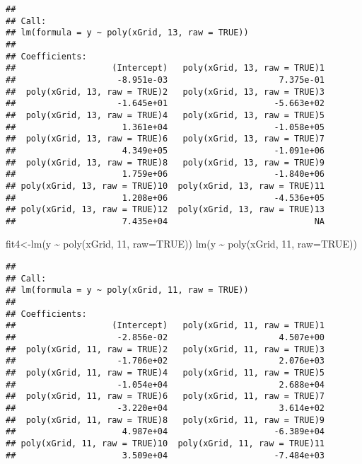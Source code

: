 \documentclass[
]{article}
\newenvironment{Shaded}{\begin{snugshade}}{\end{snugshade}}
\newcommand{\AttributeTok}[1]{\textcolor[rgb]{0.77,0.63,0.00}{#1}}
\newcommand{\ConstantTok}[1]{\textcolor[rgb]{0.00,0.00,0.00}{#1}}
\newcommand{\DecValTok}[1]{\textcolor[rgb]{0.00,0.00,0.81}{#1}}
\newcommand{\FunctionTok}[1]{\textcolor[rgb]{0.00,0.00,0.00}{#1}}
\newcommand{\NormalTok}[1]{#1}
\newcommand{\OtherTok}[1]{\textcolor[rgb]{0.56,0.35,0.01}{#1}}
\newcommand{\SpecialCharTok}[1]{\textcolor[rgb]{0.00,0.00,0.00}{#1}}
\begin{document}
\begin{verbatim}
## 
## Call:
## lm(formula = y ~ poly(xGrid, 13, raw = TRUE))
## 
## Coefficients:
##                   (Intercept)   poly(xGrid, 13, raw = TRUE)1  
##                    -8.951e-03                      7.375e-01  
##  poly(xGrid, 13, raw = TRUE)2   poly(xGrid, 13, raw = TRUE)3  
##                    -1.645e+01                     -5.663e+02  
##  poly(xGrid, 13, raw = TRUE)4   poly(xGrid, 13, raw = TRUE)5  
##                     1.361e+04                     -1.058e+05  
##  poly(xGrid, 13, raw = TRUE)6   poly(xGrid, 13, raw = TRUE)7  
##                     4.349e+05                     -1.091e+06  
##  poly(xGrid, 13, raw = TRUE)8   poly(xGrid, 13, raw = TRUE)9  
##                     1.759e+06                     -1.840e+06  
## poly(xGrid, 13, raw = TRUE)10  poly(xGrid, 13, raw = TRUE)11  
##                     1.208e+06                     -4.536e+05  
## poly(xGrid, 13, raw = TRUE)12  poly(xGrid, 13, raw = TRUE)13  
##                     7.435e+04                             NA
\end{verbatim}

\begin{Shaded}
\begin{Highlighting}[]
\NormalTok{fit4}\OtherTok{\textless{}{-}}\FunctionTok{lm}\NormalTok{(y }\SpecialCharTok{\textasciitilde{}} \FunctionTok{poly}\NormalTok{(xGrid, }\DecValTok{11}\NormalTok{, }\AttributeTok{raw=}\ConstantTok{TRUE}\NormalTok{))}
\FunctionTok{lm}\NormalTok{(y }\SpecialCharTok{\textasciitilde{}} \FunctionTok{poly}\NormalTok{(xGrid, }\DecValTok{11}\NormalTok{, }\AttributeTok{raw=}\ConstantTok{TRUE}\NormalTok{))}
\end{Highlighting}
\end{Shaded}

\begin{verbatim}
## 
## Call:
## lm(formula = y ~ poly(xGrid, 11, raw = TRUE))
## 
## Coefficients:
##                   (Intercept)   poly(xGrid, 11, raw = TRUE)1  
##                    -2.856e-02                      4.507e+00  
##  poly(xGrid, 11, raw = TRUE)2   poly(xGrid, 11, raw = TRUE)3  
##                    -1.706e+02                      2.076e+03  
##  poly(xGrid, 11, raw = TRUE)4   poly(xGrid, 11, raw = TRUE)5  
##                    -1.054e+04                      2.688e+04  
##  poly(xGrid, 11, raw = TRUE)6   poly(xGrid, 11, raw = TRUE)7  
##                    -3.220e+04                      3.614e+02  
##  poly(xGrid, 11, raw = TRUE)8   poly(xGrid, 11, raw = TRUE)9  
##                     4.987e+04                     -6.389e+04  
## poly(xGrid, 11, raw = TRUE)10  poly(xGrid, 11, raw = TRUE)11  
##                     3.509e+04                     -7.484e+03
\end{verbatim}
\end{document}
